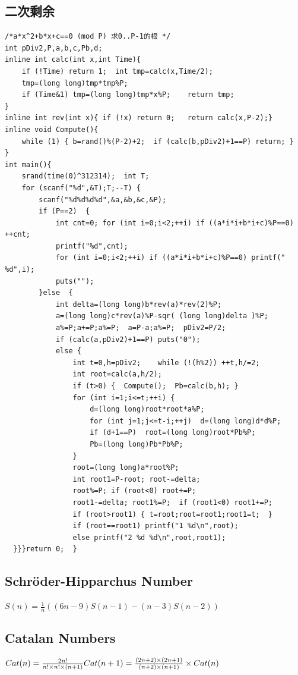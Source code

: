 \documentclass[10pt,landscape]{article}
\begin{document}
\begin{multicols}{2}
\subsection{二次剩余}
\begin{lstlisting}
/*a*x^2+b*x+c==0 (mod P) 求0..P-1的根 */
int pDiv2,P,a,b,c,Pb,d;
inline int calc(int x,int Time){
    if (!Time) return 1;  int tmp=calc(x,Time/2);
    tmp=(long long)tmp*tmp%P;
    if (Time&1) tmp=(long long)tmp*x%P;    return tmp;
}
inline int rev(int x){ if (!x) return 0;   return calc(x,P-2);}
inline void Compute(){
    while (1) { b=rand()%(P-2)+2;  if (calc(b,pDiv2)+1==P) return; }
}
int main(){
    srand(time(0)^312314);  int T;
    for (scanf("%d",&T);T;--T) {
        scanf("%d%d%d%d",&a,&b,&c,&P);
        if (P==2)  {
            int cnt=0; for (int i=0;i<2;++i) if ((a*i*i+b*i+c)%P==0) ++cnt;
            printf("%d",cnt);
            for (int i=0;i<2;++i) if ((a*i*i+b*i+c)%P==0) printf(" %d",i);
            puts("");
        }else  {
            int delta=(long long)b*rev(a)*rev(2)%P;
            a=(long long)c*rev(a)%P-sqr( (long long)delta )%P;
            a%=P;a+=P;a%=P;  a=P-a;a%=P;  pDiv2=P/2;
            if (calc(a,pDiv2)+1==P) puts("0");
            else {
                int t=0,h=pDiv2;    while (!(h%2)) ++t,h/=2;
                int root=calc(a,h/2);
                if (t>0) {  Compute();  Pb=calc(b,h); }
                for (int i=1;i<=t;++i) {
                    d=(long long)root*root*a%P;
                    for (int j=1;j<=t-i;++j)  d=(long long)d*d%P;
                    if (d+1==P)  root=(long long)root*Pb%P;
                    Pb=(long long)Pb*Pb%P;
                }
                root=(long long)a*root%P;
                int root1=P-root; root-=delta;
                root%=P; if (root<0) root+=P;
                root1-=delta; root1%=P;  if (root1<0) root1+=P;
                if (root>root1) { t=root;root=root1;root1=t;  }
                if (root==root1) printf("1 %d\n",root);
                else printf("2 %d %d\n",root,root1);
  }}}return 0;  }
\end{lstlisting}

\subsection{Schr\"oder-Hipparchus Number}
\(S(n) = \frac{1}{n}((6n - 9)S(n - 1) - (n - 3)S(n - 2)) \)

\subsection{Catalan Numbers}
\(Cat(n) = \frac{2n!}{n!\times n! \times (n + 1)} \\ 
Cat(n + 1) = \frac{(2n + 2) \times (2n + 1)}{(n + 2) \times (n + 1)}
\times Cat(n) \)


\end{multicols}
\end{document}
